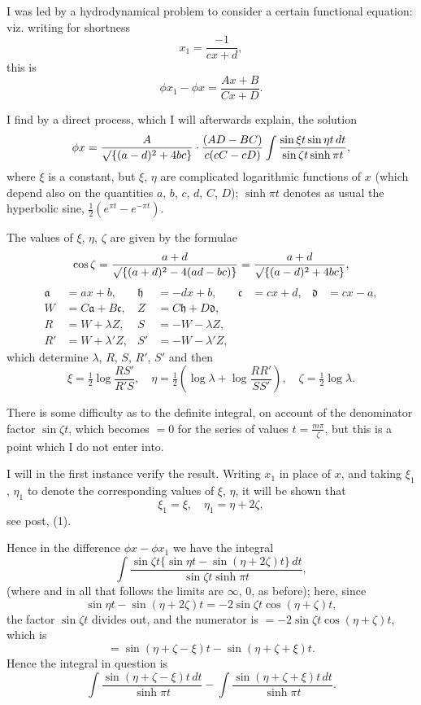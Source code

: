 \documentclass[11pt,a4paper]{book}
\begin{document}
I was led by a hydrodynamical problem to consider a certain functional equation: viz. writing for shortness
\[
x_1 = \frac{-1}{cx + d},
\]
this is
\[
\phi x_1 - \phi x = \frac{Ax + B}{Cx + D}.
\]

I find by a direct process, which I will afterwards explain, the solution
\[
\phi x = \frac{A}{\surd\{(a - d)^2 + 4bc\}} \cdot \frac{(AD - BC)}{c(cC - cD)} \int \frac{\sin \xi t \sin \eta t \, dt}{\sin \zeta t \sinh \pi t},
\]
where $\xi$ is a constant, but $\xi$, $\eta$ are complicated logarithmic functions of $x$ (which depend also on the quantities $a$, $b$, $c$, $d$, $C$, $D$); $\sinh \pi t$ denotes as usual the hyperbolic sine, $\tfrac{1}{2}(e^{\pi t} - e^{-\pi t})$.

The values of $\xi$, $\eta$, $\zeta$ are given by the formulae
\[
\cos \zeta = \frac{a + d}{\surd\{(a + d)^2 - 4(ad - bc)\}} = \frac{a + d}{\surd\{(a - d)^2 + 4bc\}},
\]
\begin{align*}
\mathfrak{a} &= ax + b, & \mathfrak{h} &= -dx + b, & \mathfrak{c} &= cx + d, & \mathfrak{d} &= cx - a, \\
W &= C\mathfrak{a} + B\mathfrak{c}, & Z &= C\mathfrak{h} + D\mathfrak{d}, & \\
R &= W + \lambda Z, & S &= -W - \lambda Z, & \\
R' &= W + \lambda' Z, & S' &= -W - \lambda' Z, &
\end{align*}
which determine $\lambda$, $R$, $S$, $R'$, $S'$ and then
\[
\xi = \tfrac{1}{2} \log \frac{RS'}{R'S}, \quad \eta = \tfrac{1}{2} \left(\log \lambda + \log \frac{RR'}{SS'}\right), \quad \zeta = \tfrac{1}{2} \log \lambda.
\]

There is some difficulty as to the definite integral, on account of the denominator factor $\sin \zeta t$, which becomes $= 0$ for the series of values $t = \frac{m\pi}{\zeta}$, but this is a point which I do not enter into.

I will in the first instance verify the result. Writing $x_1$ in place of $x$, and taking $\xi_1$, $\eta_1$ to denote the corresponding values of $\xi$, $\eta$, it will be shown that
\[
\xi_1 = \xi, \quad \eta_1 = \eta + 2\zeta,
\]
see post, (1).

Hence in the difference $\phi x - \phi x_1$ we have the integral
\[
\int \frac{\sin \zeta t \{\sin \eta t - \sin(\eta + 2\zeta)t\} \, dt}{\sin \zeta t \sinh \pi t},
\]
(where and in all that follows the limits are $\infty$, $0$, as before); here, since
\[
\sin \eta t - \sin(\eta + 2\zeta)t = -2\sin \zeta t \cos(\eta + \zeta)t,
\]
the factor $\sin \zeta t$ divides out, and the numerator is $= -2\sin \zeta t \cos(\eta + \zeta)t$, which is
\[
= \sin(\eta + \zeta - \xi)t - \sin(\eta + \zeta + \xi)t.
\]
Hence the integral in question is
\[
\int \frac{\sin(\eta + \zeta - \xi)t \, dt}{\sinh \pi t} - \int \frac{\sin(\eta + \zeta + \xi)t \, dt}{\sinh \pi t}.
\]
\end{document}
